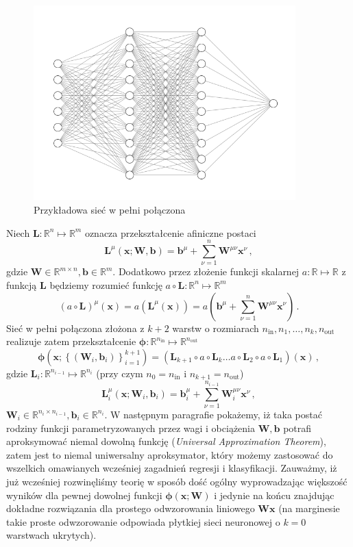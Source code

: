 \documentclass{myclass}
\numberwithin{equation}{subsection}
\begin{document}
\begin{figure}[ht]
    \centering
    \includegraphics[width=0.9\textwidth]{figs/fcn.png}
    \caption{Przykładowa sieć w pełni połączona}
    \label{fig:fcn}
\end{figure}

Niech \(\bm{L}: \mathbb{R}^{n} \mapsto \mathbb{R}^{m}\) oznacza przekształcenie afiniczne postaci
\[
\bm{L}^\mu(\bm{x}; \bm{W}, \bm{b}) = \bm{b}^\mu + \sum_{\nu=1}^{n} \bm{W}^{\mu\nu}\bm{x}^\nu\,,
\]
gdzie \(\bm{W} \in \mathbb{R}^{m \times n}, \bm{b} \in \mathbb{R}^m\). Dodatkowo przez złożenie
funkcji skalarnej \(a: \mathbb{R} \mapsto \mathbb{R}\) z funkcją \(\bm{L}\) będziemy rozumieć
funkcję \(a \circ \bm{L} : \mathbb{R}^n \mapsto \mathbb{R}^m\)
\[
(a \circ \bm{L})^\mu (\bm{x}) = a\left(\bm{L}^\mu(\bm{x})\right) = a\left(\bm{b}^\mu + \sum_{\nu=1}^{n} \bm{W}^{\mu\nu}\bm{x}^\nu\right)\,.
\]
Sieć w pełni połączona złożona z \(k+2\) warstw o rozmiarach \(n_\text{in}, n_1, \ldots, n_k,
n_\text{out}\) realizuje zatem przekształcenie \(\bm{\phi}: \mathbb{R}^{n_\text{in}} \mapsto
\mathbb{R}^{n_\text{out}}\)
\[
\boxed
{
\bm{\phi}\left(\bm{x}; \left\{(\bm{W}_i, \bm{b}_i)\right\}_{i=1}^{k+1}\right) = \left( \bm{L}_{k+1} \circ a \circ \bm{L}_k \ldots a \circ \bm{L}_2 \circ a \circ \bm{L}_1 \right) (\bm{x}) \,,
}
\]
gdzie \(\bm{L}_i : \mathbb{R}^{n_{i-1}} \mapsto \mathbb{R}^{n_i}\) (przy czym \(n_0 = n_\text{in}\)
i \(n_{k+1} = n_\text{out}\))
\[
\boxed
{
\bm{L}_i^\mu \left(\bm{x}; \bm{W}_i, \bm{b}_i\right) = \bm{b}_i^\mu + \sum_{\nu=1}^{n_{i-1}} \bm{W}_i^{\mu\nu}\bm{x}^\nu\,,
}
\]
\(\bm{W}_i \in \mathbb{R}^{n_i \times n_{i-1}}, \bm{b}_i \in \mathbb{R}^{n_i}\). W następnym
paragrafie pokażemy, iż taka postać rodziny funkcji parametryzowanych przez wagi i obciążenia
\(\bm{W}, \bm{b}\) potrafi aproksymować niemal dowolną funkcję (\textit{Universal Approximation
Theorem}), zatem jest to niemal uniwersalny aproksymator, który możemy zastosować do wszelkich
omawianych wcześniej zagadnień regresji i klasyfikacji. Zauważmy, iż już wcześniej rozwinęliśmy
teorię w sposób dość ogólny wyprowadzając większość wyników dla pewnej dowolnej funkcji
\(\bm{\phi}(\bm{x}; \bm{W})\) i jedynie na końcu znajdując dokładne rozwiązania dla prostego
odwzorowania liniowego \(\bm{W}\bm{x}\) (na marginesie takie proste odwzorowanie odpowiada płytkiej
sieci neuronowej o \(k=0\) warstwach ukrytych).
\end{document}
